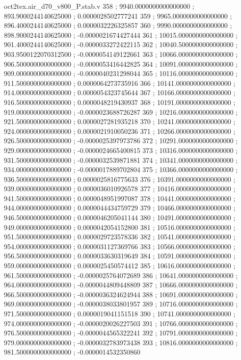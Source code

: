 \begin{filecontents}[overwrite]{oct2tex.air_d70_v800_P.stab.v}
358 ; 9940.0000000000000000 ; 893.9000244140625000 ; 0.0000028502777241
359 ; 9965.0000000000000000 ; 896.4000244140625000 ; 0.0000032226325857
360 ; 9990.0000000000000000 ; 898.9000244140625000 ; -0.0000021674427444
361 ; 10015.0000000000000000 ; 901.4000244140625000 ; -0.0000033272422115
362 ; 10040.5000000000000000 ; 903.9500122070312500 ; -0.0000054149122661
363 ; 10066.0000000000000000 ; 906.5000000000000000 ; -0.0000053416442825
364 ; 10091.0000000000000000 ; 909.0000000000000000 ; -0.0000040231298044
365 ; 10116.0000000000000000 ; 911.5000000000000000 ; 0.0000064273735916
366 ; 10141.0000000000000000 ; 914.0000000000000000 ; 0.0000054323745644
367 ; 10166.0000000000000000 ; 916.5000000000000000 ; 0.0000048219430937
368 ; 10191.0000000000000000 ; 919.0000000000000000 ; -0.0000023688726287
369 ; 10216.0000000000000000 ; 921.5000000000000000 ; 0.0000027281935218
370 ; 10241.0000000000000000 ; 924.0000000000000000 ; 0.0000021910050236
371 ; 10266.0000000000000000 ; 926.5000000000000000 ; -0.0000025397973786
372 ; 10291.0000000000000000 ; 929.0000000000000000 ; -0.0000024665400815
373 ; 10316.0000000000000000 ; 931.5000000000000000 ; -0.0000032539871881
374 ; 10341.0000000000000000 ; 934.0000000000000000 ; -0.0000017889702804
375 ; 10366.0000000000000000 ; 936.5000000000000000 ; 0.0000025816775633
376 ; 10391.0000000000000000 ; 939.0000000000000000 ; 0.0000036010926578
377 ; 10416.0000000000000000 ; 941.5000000000000000 ; 0.0000048951997087
378 ; 10441.0000000000000000 ; 944.0000000000000000 ; 0.0000044434759729
379 ; 10466.0000000000000000 ; 946.5000000000000000 ; 0.0000046205041144
380 ; 10491.0000000000000000 ; 949.0000000000000000 ; 0.0000042054152800
381 ; 10516.0000000000000000 ; 951.5000000000000000 ; 0.0000029723578336
382 ; 10541.0000000000000000 ; 954.0000000000000000 ; 0.0000031127369766
383 ; 10566.0000000000000000 ; 956.5000000000000000 ; 0.0000033630319649
384 ; 10591.0000000000000000 ; 959.0000000000000000 ; 0.0000025450574412
385 ; 10616.0000000000000000 ; 961.5000000000000000 ; -0.0000025764072689
386 ; 10641.0000000000000000 ; 964.0000000000000000 ; -0.0000044809448809
387 ; 10666.0000000000000000 ; 966.5000000000000000 ; -0.0000036324624944
388 ; 10691.0000000000000000 ; 969.0000000000000000 ; -0.0000038033801957
389 ; 10716.0000000000000000 ; 971.5000000000000000 ; 0.0000019041151518
390 ; 10741.0000000000000000 ; 974.0000000000000000 ; -0.0000020026227503
391 ; 10766.0000000000000000 ; 976.5000000000000000 ; -0.0000044565322241
392 ; 10791.0000000000000000 ; 979.0000000000000000 ; -0.0000032783973438
393 ; 10816.0000000000000000 ; 981.5000000000000000 ; -0.0000014532350860

\end{filecontents}
